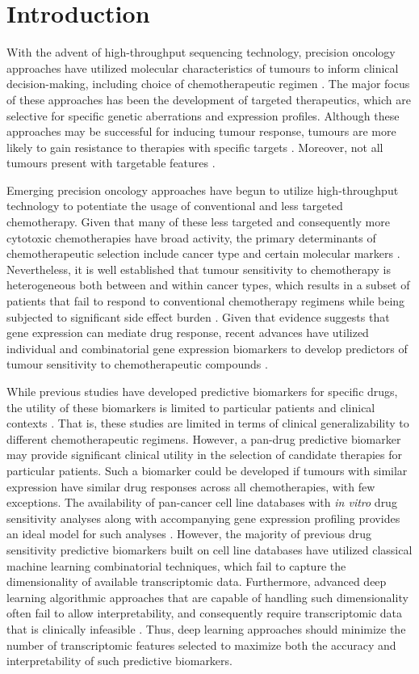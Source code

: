 \documentclass[10pt, letterpaper, twocolumn]{article}
\begin{document}
\section{Introduction}
With the advent of high-throughput sequencing technology, precision oncology approaches have utilized molecular characteristics of tumours to inform clinical decision-making, including choice of chemotherapeutic regimen \cite{drugml, patient_resps}. The major focus of these approaches has been the development of targeted therapeutics, which are selective for specific genetic aberrations and expression profiles. Although these approaches may be successful for inducing tumour response, tumours are more likely to gain resistance to therapies with specific targets \cite{small_mol}. Moreover, not all tumours present with targetable features \cite{small_mol}.

Emerging precision oncology approaches have begun to utilize high-throughput technology to potentiate the usage of conventional and less targeted chemotherapy. Given that many of these less targeted and consequently more cytotoxic chemotherapies have broad activity, the primary determinants of chemotherapeutic selection include cancer type and certain molecular markers \cite{adverse}. Nevertheless, it is well established that tumour sensitivity to chemotherapy is heterogeneous both between and within cancer types, which results in a subset of patients that fail to respond to conventional chemotherapy regimens while being subjected to significant side effect burden \cite{adjuvant}. Given that evidence suggests that gene expression can mediate drug response, recent advances have utilized individual and combinatorial gene expression biomarkers to develop predictors of tumour sensitivity to chemotherapeutic compounds \cite{integrated}.

While previous studies have developed predictive biomarkers for specific drugs, the utility of these biomarkers is limited to particular patients and clinical contexts \cite{drug_sense}. That is, these studies are limited in terms of clinical generalizability to different chemotherapeutic regimens. However, a pan-drug predictive biomarker may provide significant clinical utility in the selection of candidate therapies for particular patients. Such a biomarker could be developed if tumours with similar expression have similar drug responses across all chemotherapies, with few exceptions. The availability of pan-cancer cell line databases with \textit{in vitro} drug sensitivity analyses along with accompanying gene expression profiling provides an ideal model for such analyses \cite{gdsc}. However, the majority of previous drug sensitivity predictive biomarkers built on cell line databases have utilized classical machine learning combinatorial techniques, which fail to capture the dimensionality of available transcriptomic data. Furthermore, advanced deep learning algorithmic approaches that are capable of handling such dimensionality often fail to allow interpretability, and consequently require transcriptomic data that is clinically infeasible \cite{ml_oncol}. Thus, deep learning approaches should minimize the number of transcriptomic features selected to maximize both the accuracy and interpretability of such predictive biomarkers.
\end{document}
